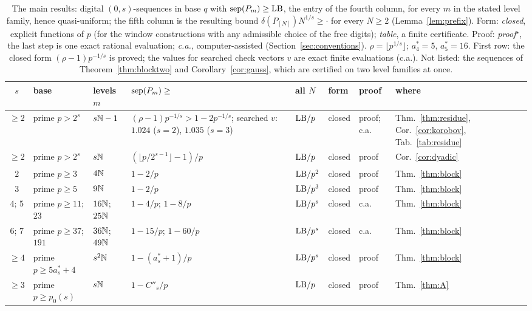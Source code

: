 \begin{table}[t]
\centering
\footnotesize
\setlength{\tabcolsep}{2.3pt}
\caption{The main results: digital $(0,s)$-sequences in base $q$ with $\operatorname{sep}(P_m)\ge\mathrm{LB}$, the entry of the fourth column, for every $m$ in the stated level family, hence quasi-uniform; the fifth column is the resulting bound $\delta(P_{[N]})N^{1/s}\ge\cdot$ for every $N\ge2$ (Lemma~\ref{lem:prefix}). Form: \emph{closed}, explicit functions of $p$ (for the window constructions with any admissible choice of the free digits); \emph{table}, a finite certificate. Proof: \emph{proof${}^\star$}, the last step is one exact rational evaluation; \emph{c.a.}, computer-assisted (Section~\ref{sec:conventions}). $\rho=\lfloor p^{1/s}\rfloor$; $a^*_4=5$, $a^*_5=16$. First row: the closed form $(\rho-1)p^{-1/s}$ is proved; the values for searched check vectors $v$ are exact finite evaluations (c.a.). Not listed: the sequences of Theorem~\ref{thm:blocktwo} and Corollary~\ref{cor:gauss}, which are certified on two level families at once.}
\label{tab:results}
\begin{tabular}{@{}c>{\raggedright\arraybackslash}p{}l>{\raggedright\arraybackslash}p{}lll>{\raggedright\arraybackslash}p{}@{}}
\toprule
$s$ & base & levels $m$ & $\operatorname{sep}(P_m)\ge$ & all $N$ & form & proof & where\\
\midrule
$\ge2$ & prime $p>2^s$ & $s\mathbb{N}-1$ & $(\rho-1)p^{-1/s}>1-2p^{-1/s}$; searched $v$: $1.024$ ($s=2$), $1.035$ ($s=3$) & $\mathrm{LB}/p$ & closed & proof; c.a. & Thm.~\ref{thm:residue}, Cor.~\ref{cor:korobov}, Tab.~\ref{tab:residue}\\
$\ge2$ & prime $p>2^s$ & $s\mathbb{N}$ & $(\lfloor p/2^{s-1}\rfloor-1)/p$ & $\mathrm{LB}/p$ & closed & proof & Cor.~\ref{cor:dyadic}\\
$2$ & prime $p\ge3$ & $4\mathbb{N}$ & $1-2/p$ & $\mathrm{LB}/p^2$ & closed & proof & Thm.~\ref{thm:block}\\
$3$ & prime $p\ge5$ & $9\mathbb{N}$ & $1-2/p$ & $\mathrm{LB}/p^3$ & closed & proof & Thm.~\ref{thm:block}\\
$4$; $5$ & prime $p\ge11$; $23$ & $16\mathbb{N}$; $25\mathbb{N}$ & $1-4/p$; $1-8/p$ & $\mathrm{LB}/p^s$ & closed & c.a. & Thm.~\ref{thm:block}\\
$6$; $7$ & prime $p\ge37$; $191$ & $36\mathbb{N}$; $49\mathbb{N}$ & $1-15/p$; $1-60/p$ & $\mathrm{LB}/p^s$ & closed & c.a. & Thm.~\ref{thm:block}\\
$\ge4$ & prime $p\ge5a^*_s+4$ & $s^2\mathbb{N}$ & $1-(a^*_s+1)/p$ & $\mathrm{LB}/p^s$ & closed & proof & Thm.~\ref{thm:block}\\
$\ge3$ & prime $p\ge p_0(s)$ & $s\mathbb{N}$ & $1-C''_s/p$ & $\mathrm{LB}/p$ & closed & proof & Thm.~\ref{thm:A}\\

\end{tabular}
\end{table}

